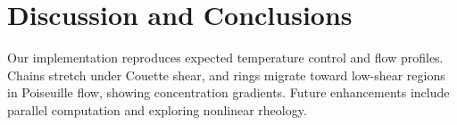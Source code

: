 \documentclass[11pt,a4paper]{article}
\begin{document}
\section{Discussion and Conclusions}
Our implementation reproduces expected temperature control and flow profiles. Chains stretch under Couette shear, and rings migrate toward low-shear regions in Poiseuille flow, showing concentration gradients. Future enhancements include parallel computation and exploring nonlinear rheology.
\end{document}
